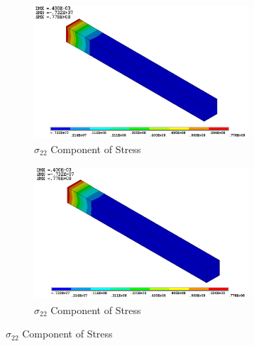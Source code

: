 \documentclass[12pt,a4paper,twoside,openright]{report}
\begin{document}
\begin{figure}[htbp!]\ContinuedFloat     
     \begin{subfigure}[b]{0.4\textwidth}
        \includegraphics[width=8cm,height=5cm]{16.Ansys_SY.png}
         \caption{ $\sigma_{22}$ Component of Stress}
         \label{fig:Y Component of Stress}
     \end{subfigure}
    \hspace{1.8cm}
      \begin{subfigure}[b]{0.4\textwidth}
         \includegraphics[width=8cm,height=5cm]{19.User_SY.png}
         \caption{ $\sigma_{22}$ Component of Stress}
         \label{fig:Y Component of Stress2}
     \end{subfigure}
\end{figure}
\FloatBarrier
\end{document}
